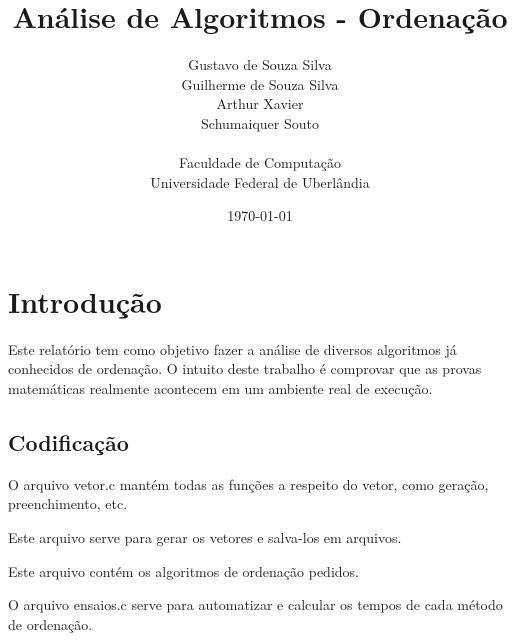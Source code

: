 \documentclass[12pt,a4paper,twoside]{report}
\title{Análise de Algoritmos - Ordenação}
\date{}
\author{Gustavo de Souza Silva \\ Guilherme de Souza Silva \\ Arthur Xavier \\ Schumaiquer Souto \\
\vspace{1cm} \\
Faculdade de Computação \\
Universidade Federal de Uberlândia
}
\date{\today}
\begin{document}
  \maketitle
\listoffigures            
\listoftables            
\lstlistoflistings

\tableofcontents    


\fancyhead[RE,LO]{\thesection}

\setlength{\parskip}{0.15in} %

\chapter{Introdução}
Este relatório tem como objetivo fazer a análise de diversos algoritmos já conhecidos de ordenação. O intuito deste trabalho é comprovar que as provas matemáticas realmente acontecem em um ambiente real de execução.

\section{Codificação}
O arquivo vetor.c mantém todas as funções a respeito do vetor, como geração, preenchimento, etc.


Este arquivo serve para gerar os vetores e salva-los em arquivos.


Este arquivo contém os algoritmos de ordenação pedidos.


O arquivo ensaios.c serve para automatizar e calcular os tempos de cada método de ordenação.

\end{document}

